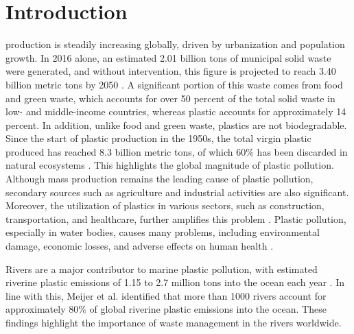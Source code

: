 \documentclass{ieeeaccess}
\begin{document}
\section{Introduction}
\label{sec:introduction}
 production is steadily increasing globally, driven by urbanization and population growth. In 2016 alone, an estimated 2.01 billion tons of municipal solid waste were generated, and without intervention, this figure is projected to reach 3.40 billion metric tons by 2050 \cite{RePEc:wbk:wbpubs:30317}. A significant portion of this waste comes from food and green waste, which accounts for over 50 percent of the total solid waste in low- and middle-income countries, whereas plastic accounts for approximately 14 percent. In addition, unlike food and green waste, plastics are not biodegradable. Since the start of plastic production in the 1950s, the total virgin plastic produced has reached 8.3 billion metric tons, of which 60\% has been discarded in natural ecosystems \cite{geyer2017production}. This highlights the global magnitude of plastic pollution. Although mass production remains the leading cause of plastic pollution, secondary sources such as agriculture \cite{cui2024impact, tian2024understanding, wang2024operating, chen2024global, lakhiar2024plastic} and industrial activities \cite{karakurt2025microplastics} are also significant. Moreover, the utilization of plastics in various sectors, such as construction, transportation, and healthcare, further amplifies this problem \cite{nayanathara2024world}. Plastic pollution, especially in water bodies, causes many problems, including environmental damage, economic losses, and adverse effects on human health \cite{GonzlezFernndez2021FloatingML, Lebreton2018EvidenceTT, Emmerik2019PlasticDI}.

Rivers are a major contributor to marine plastic pollution, with estimated riverine plastic emissions of 1.15 to 2.7 million tons into the ocean each year \cite{Lebreton2017RiverPE}. In line with this, Meijer et al. \cite{Meijer2021MoreT1} identified that more than 1000 rivers account for approximately 80\% of global riverine plastic emissions into the ocean. These findings highlight the importance of waste management in the rivers worldwide.
\end{document}
